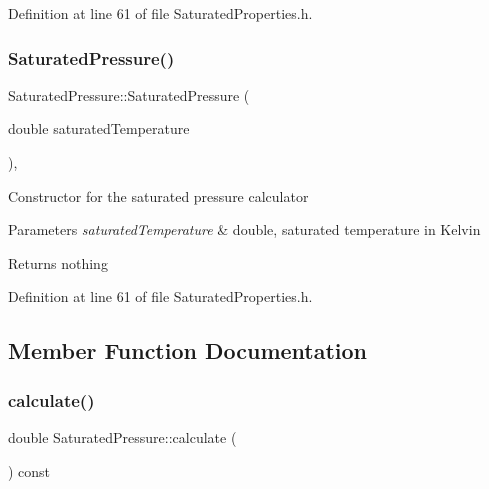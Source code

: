 Definition at line 61 of file Saturated\+Properties.\+h.

\mbox{\label{class_saturated_pressure_a67020b0bb7588c643e12e256fa25e0bc}} 
\subsubsection{\texorpdfstring{Saturated\+Pressure()}{SaturatedPressure()}\hspace{0.1cm}{\footnotesize\ttfamily [3/3]}}
{\footnotesize\ttfamily Saturated\+Pressure\+::\+Saturated\+Pressure (\begin{DoxyParamCaption}\item[{double}]{saturated\+Temperature }\end{DoxyParamCaption})\hspace{0.3cm}{\ttfamily [inline]}, {\ttfamily [explicit]}}

Constructor for the saturated pressure calculator


\begin{DoxyParams}{Parameters}
{\em saturated\+Temperature} & double, saturated temperature in Kelvin\\
\hline
\end{DoxyParams}
\begin{DoxyReturn}{Returns}
nothing 
\end{DoxyReturn}


Definition at line 61 of file Saturated\+Properties.\+h.



\subsection{Member Function Documentation}
\mbox{\label{class_saturated_pressure_a8ef5357b4f8af1aeaa8dde6ae05b9daa}} 
\subsubsection{\texorpdfstring{calculate()}{calculate()}\hspace{0.1cm}{\footnotesize\ttfamily [1/3]}}
{\footnotesize\ttfamily double Saturated\+Pressure\+::calculate (\begin{DoxyParamCaption}{ }\end{DoxyParamCaption}) const}

